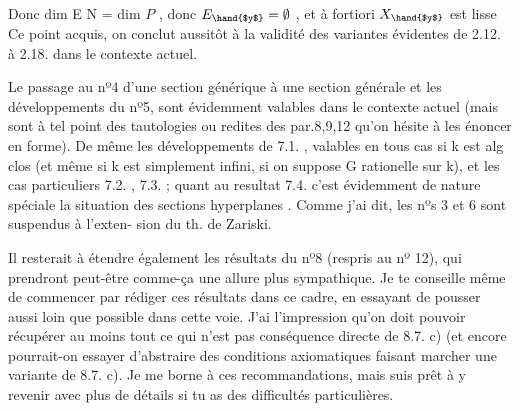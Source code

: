 
Donc dim E \hand{$<$} N = dim $P$ , donc $E_{\hand{$y$}} = \emptyset$ , et à fortiori $X_{\hand{$y$}}$ est lisse
Ce point acquis, on conclut aussitôt à la validité des variantes
évidentes de 2.12. à 2.18. dans le contexte actuel.

Le passage au nº4 d'une section générique à une section générale
et les développements du nº5, sont évidemment valables dans le contexte
actuel (mais sont à tel point des tautologies ou redites des
par.8,9,12 \xout{)} qu'on hésite à les énoncer en forme). De même les
développements de 7.1. , valables en tous cas si k est  alg clos
(et même si k est simplement infini, si on suppose G rationelle sur k),
et les cas particuliers 7.2. , 7.3. ; quant au resultat 7.4. 
c'est évidemment  de nature spéciale   la situation des sections
hyperplanes . Comme j'ai dit, les nºs 3 et 6 sont suspendus à l'exten-%
sion du th. de Zariski.

Il resterait à étendre également les résultats du nº8 (respris au
nº 12), qui prendront peut-être comme-ça une allure plus sympathique.
Je te conseille même de commencer par rédiger ces résultats dans ce cadre,
en essayant de pousser aussi loin que possible dans cette voie. J'ai
l'impression qu'on doit pouvoir récupérer au moins tout ce qui n'est pas
conséquence directe de 8.7. c) (et encore pourrait-on essayer
d'abstraire des conditions axiomatiques faisant marcher une variante de
8.7. c). Je me borne à ces recommandations, mais suis prêt à y revenir
avec plus de détails si tu as des difficultés particulières.

